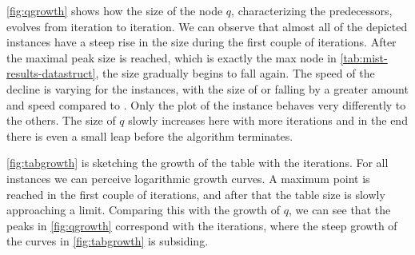 \autoref{fig:qgrowth} shows how the size of the node $q$, characterizing the predecessors, evolves from iteration to iteration. 
We can observe that almost all of the depicted instances have a steep rise in the size during the first couple of iterations. After the maximal peak size is reached, which is exactly the max node in \autoref{tab:mist-results-datastruct}, the size gradually begins to fall again. The speed of the decline is varying for the instances, with the size of  or  falling by a greater amount and speed compared to .
Only the plot of the  instance behaves very differently to the others. The size of $q$ slowly increases here with more iterations and in the end there is even a small leap before the algorithm terminates. 

\autoref{fig:tabgrowth} is sketching the growth of the table with the iterations. For all instances we can perceive logarithmic growth curves. A maximum point is reached in the first couple of iterations, and after that the table size is slowly approaching a limit. Comparing this with the growth of $q$, we can see that the peaks in \autoref{fig:qgrowth} correspond with the iterations, where the steep growth of the curves in \autoref{fig:tabgrowth} is subsiding.








%




